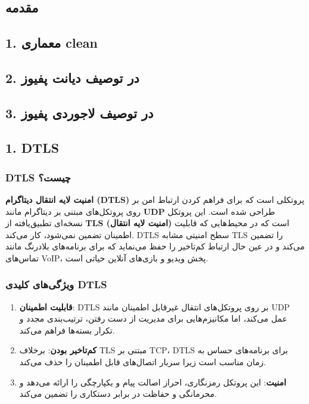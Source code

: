 \def \Subject {تمرین چهارم}
\def \Session {4}
\def \Author {مهران رزاقی - حامد سادات - عرفان همتی}
\def \Date {1404/05/31}
\setcounter{chapter}{\Session}

\chapter*{}

\section*{مقدمه}

\section*{1. معماری clean}

\section*{2. در توصیف دیانت پفیوز}

\section*{3. در توصیف لاجوردی پفیوز}

\newpage
\section*{1. DTLS}
\subsection*{DTLS چیست؟}

\textbf{امنیت لایه انتقال دیتاگرام (DTLS)} پروتکلی است که برای فراهم کردن ارتباط امن بر روی پروتکل‌های مبتنی بر دیتاگرام مانند \textbf{UDP} طراحی شده است. این پروتکل نسخه‌ای تطبیق‌یافته از \textbf{TLS (امنیت لایه انتقال)} است که در محیط‌هایی که قابلیت اطمینان تضمین نمی‌شود، کار می‌کند. DTLS سطح امنیتی مشابه TLS را تضمین می‌کند و در عین حال ارتباط کم‌تاخیر را حفظ می‌نماید که برای برنامه‌های بلادرنگ مانند تماس‌های VoIP، پخش ویدیو و بازی‌های آنلاین حیاتی است.

\subsection*{ویژگی‌های کلیدی DTLS}
\begin{enumerate}
    \item \textbf{قابلیت اطمینان}: DTLS بر روی پروتکل‌های انتقال غیرقابل اطمینان مانند UDP عمل می‌کند، اما مکانیزم‌هایی برای مدیریت از دست رفتن، ترتیب‌بندی مجدد و تکرار بسته‌ها فراهم می‌کند.
    \item \textbf{کم‌تاخیر بودن}: برخلاف TLS مبتنی بر TCP، DTLS برای برنامه‌های حساس به زمان مناسب است زیرا سربار اتصال‌های قابل اطمینان را حذف می‌کند.
    \item \textbf{امنیت}: این پروتکل رمزنگاری، احراز اصالت پیام و یکپارچگی را ارائه می‌دهد و محرمانگی و حفاظت در برابر دستکاری را تضمین می‌کند.
\end{enumerate}

